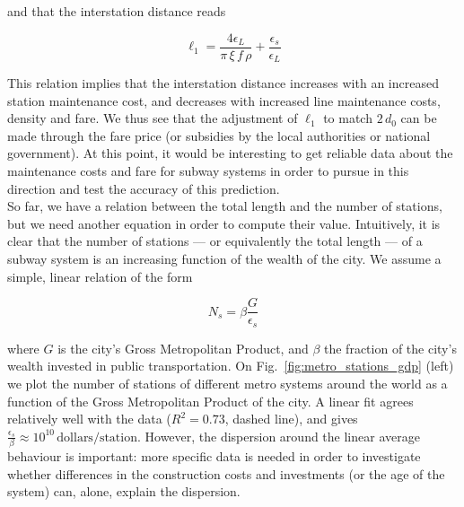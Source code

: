 and that the interstation distance reads

\begin{equation}
    \ell_1 = \frac{4 \epsilon_L}{\pi\,\xi\,f\,\rho} + \frac{\epsilon_s}{\epsilon_L}
\end{equation}

This relation implies that the interstation distance increases with an increased
station maintenance cost, and decreases with increased line maintenance costs,
density and fare. We thus see that the adjustment of $\ell_1$ to match $2\,d_0$
can be made through the fare price (or subsidies by the local authorities or
national government). At this point, it would be interesting to get reliable
data about the maintenance costs and fare for subway systems in order to pursue
in this direction and test the accuracy of this prediction.\\

So far, we have a relation between the total length and the number of stations,
but we need another equation in order to compute their value. Intuitively, it is
clear that the number of stations --- or equivalently the total length --- of a
subway system is an increasing function of the wealth of the city. We assume a
simple, linear relation of the form

\begin{equation}
    N_s = \beta \frac{G}{\epsilon_s}
\end{equation}

where $G$ is the city's Gross Metropolitan Product, and $\beta$ the fraction of
the city's wealth invested in public transportation.  On Fig.~\ref{fig:metro_stations_gdp} (left) we plot the number of
stations of different metro systems around the world as a function of the Gross
Metropolitan Product of the city. A linear fit agrees relatively well with the
data ($R^2=0.73$, dashed line), and gives $\frac{\epsilon_s}{\beta} \approx
10^{10}\,\text{dollars/station}$. However, the dispersion around the linear
average behaviour is important: more specific data is needed in order to
investigate whether differences in the construction costs and investments (or
the age of the system) can, alone, explain the dispersion.

